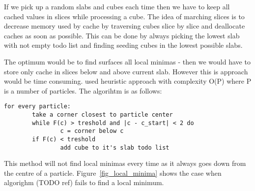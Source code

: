 If we pick up a random slabs and cubes each time then we have to keep all cached values in slices while processing a cube. The idea of marching slices is to decrease memory used by cache by traversing cubes slice by slice and deallocate caches as soon as possible. This can be done by always picking the lowest slab with not empty todo list and finding seeding cubes in the lowest possible slabs. 

The optimum would be to find surfaces all local minimas - then we would have to store only cache in slices below and above current slab. However this is approach would be time consuming. \cite{RosenbergBirdwell2008} used heuristic approach with complexity O(P) where P is a number of particles. The algorihtm is as follows:
\begin{verbatim}
for every particle:
        take a corner closest to particle center
        while F(c) > treshold and |c - c_start| < 2 do
                c = corner below c
        if F(c) < treshold
                add cube to it's slab todo list
\end{verbatim}

This method will not find local minimas every time as it always goes down from the centre of a particle. Figure~\ref{fig_local_minima} shows the case when algorighm (TODO ref) fails to find a local minimum. 


